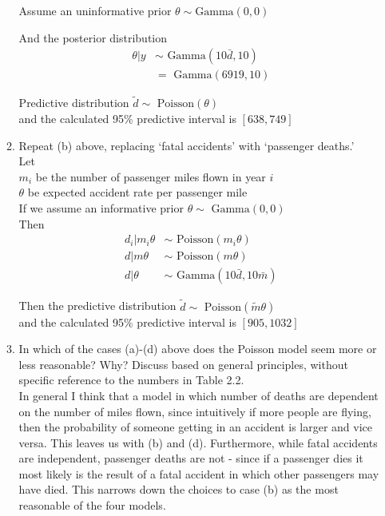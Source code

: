 \documentclass[11pt]{article}
\newcommand{\Gam}{\text{ Gamma}}
\newcommand{\Pois}{\text{ Poisson}}
\theoremstyle{definition}
\theoremstyle{remark}
\theoremstyle{definition}
\begin{document}
\begin{enumerate}
\begin{enumerate}
	Assume an uninformative prior $\theta \sim \text{Gamma}(0,0)$
	
	And the posterior distribution 
	\begin{align*}
		\theta|y & \sim \Gam( 10\bar{d}, 10)\\
		&= \Gam(6919, 10)
	\end{align*} 

	Predictive distribution $\tilde d \sim \Pois(\theta)$\\
	and the calculated 95\% predictive interval is $[638, 749]$\\
	
	\item Repeat (b) above, replacing ‘fatal accidents’ with ‘passenger deaths.’\\

		Let \\
		$m_i$ be the number of passenger miles flown in year $i$\\
		$\theta$ be expected accident rate per passenger mile\\
		If we assume an informative prior $\theta \sim \Gam(0,0)$\\
		Then 		\begin{align*}
		d_i | m_i \theta &\sim \Pois (m_i\theta) \\
		d| m \theta &\sim \Pois (m\theta) \\
		d|\theta &\sim \Gam (10\bar d, 10 \bar m) 
		\end{align*}
		
		
		Then the predictive distribution $\tilde d \sim \Pois (\tilde m\theta) $\\
		and the calculated 95\% predictive interval is $[905, 1032]$ \\

	\item In which of the cases (a)-(d) above does the Poisson model seem more or less reasonable? Why? Discuss based on general principles, without specific reference to the numbers in Table 2.2.\\
		
		In general I think that a model in which number of deaths are dependent on the number of miles flown, since intuitively if more people are flying, then the probability of someone getting in an accident is larger and vice versa. This leaves us with (b) and (d). Furthermore, while fatal accidents are independent, passenger deaths are not - since if a passenger dies it most likely is the result of a fatal accident in which other passengers may have died. This narrows down the choices to case (b) as the most reasonable of the four models. 
		

\end{enumerate}
\end{enumerate}
\end{document}
